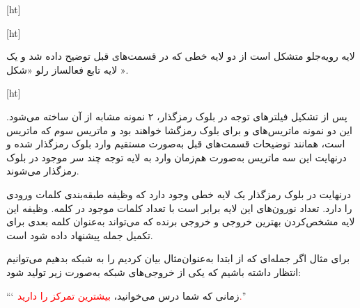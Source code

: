 [ht]



[ht]








لایه رو‌یه‌جلو متشکل است از دو لایه خطی که در قسمت‌های قبل توضیح داده شد و یک لایه تابع فعالساز رلو «شکل ».


[ht]




پس از تشکیل فیلترهای توجه در بلوک رمزگذار، ۲ نمونه مشابه از آن ساخته می‌شود. این دو نمونه ماتریس‌های  و  برای بلوک رمزگشا خواهند بود و ماتریس سوم که ماتریس  است، همانند توضیحات قسمت‌های قبل به‌صورت مستقیم وارد بلوک رمزگذار شده و درنهایت این سه ماتریس به‌صورت هم‌زمان وارد به لایه توجه چند سر موجود در بلوک رمزگذار می‌شوند.


درنهایت در بلوک رمزگذار یک لایه خطی وجود دارد که وظیفه طبقه‌بندی کلمات ورودی را دارد. تعداد نورون‌های این لایه برابر است با تعداد کلمات موجود در کلمه. وظیفه این لایه مشخص‌کردن بهترین خروجی و خروجی برنده که می‌تواند به‌عنوان کلمه بعدی برای تکمیل جمله پیشنهاد داده شود است.


برای مثال اگر جمله‌ای که از ابتدا به‌عنوان‌مثال بیان کردیم را به شبکه بدهیم می‌توانیم انتظار داشته باشیم که یکی از خروجی‌های شبکه به‌صورت زیر تولید شود:


``` زمانی که شما درس می‌خوانید، \textcolor{red}{بیشترین تمرکز را دارید.}''
